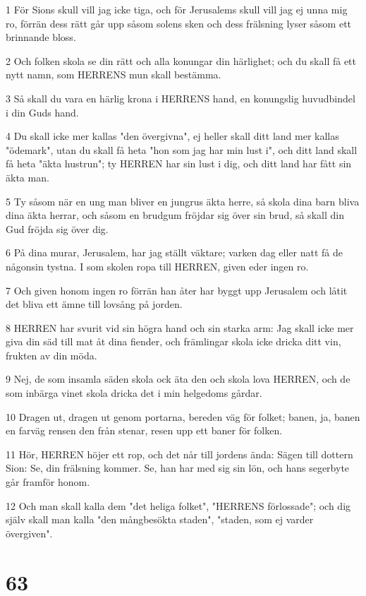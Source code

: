\par 1 För Sions skull vill jag icke tiga, och för Jerusalems skull vill jag ej unna mig ro, förrän dess rätt går upp såsom solens sken och dess frälsning lyser såsom ett brinnande bloss.
\par 2 Och folken skola se din rätt och alla konungar din härlighet; och du skall få ett nytt namn, som HERRENS mun skall bestämma.
\par 3 Så skall du vara en härlig krona i HERRENS hand, en konungslig huvudbindel i din Guds hand.
\par 4 Du skall icke mer kallas "den övergivna", ej heller skall ditt land mer kallas "ödemark", utan du skall få heta "hon som jag har min lust i", och ditt land skall få heta "äkta hustrun"; ty HERREN har sin lust i dig, och ditt land har fått sin äkta man.
\par 5 Ty såsom när en ung man bliver en jungrus äkta herre, så skola dina barn bliva dina äkta herrar, och såsom en brudgum fröjdar sig över sin brud, så skall din Gud fröjda sig över dig.
\par 6 På dina murar, Jerusalem, har jag ställt väktare; varken dag eller natt få de någonsin tystna. I som skolen ropa till HERREN, given eder ingen ro.
\par 7 Och given honom ingen ro förrän han åter har byggt upp Jerusalem och låtit det bliva ett ämne till lovsång på jorden.
\par 8 HERREN har svurit vid sin högra hand och sin starka arm: Jag skall icke mer giva din säd till mat åt dina fiender, och främlingar skola icke dricka ditt vin, frukten av din möda.
\par 9 Nej, de som insamla säden skola ock äta den och skola lova HERREN, och de som inbärga vinet skola dricka det i min helgedoms gårdar.
\par 10 Dragen ut, dragen ut genom portarna, bereden väg för folket; banen, ja, banen en farväg rensen den från stenar, resen upp ett baner för folken.
\par 11 Hör, HERREN höjer ett rop, och det når till jordens ända: Sägen till dottern Sion: Se, din frälsning kommer. Se, han har med sig sin lön, och hans segerbyte går framför honom.
\par 12 Och man skall kalla dem "det heliga folket", "HERRENS förlossade"; och dig själv skall man kalla "den mångbesökta staden", "staden, som ej varder övergiven".

\chapter{63}

